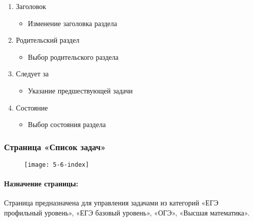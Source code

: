 \begin{enumerate}
\begin{enumerate}
\begin{enumerate}
			\item Заголовок
			\begin{itemize}
				\item Изменение заголовка раздела
			\end{itemize}

			\item Родительский раздел
			\begin{itemize}
				\item Выбор родительского раздела
			\end{itemize}

			\item Следует за
			\begin{itemize}
				\item Указание предшествующей задачи
			\end{itemize}

			\item Состояние
			\begin{itemize}
				\item Выбор состояния раздела
			\end{itemize}

		\end{enumerate}
	\end{enumerate}
\end{enumerate}

\subsubsection{Страница «Список задач»}
\begin{figure}[H]
	\texttt{[image: 5-6-index]}
\end{figure}
\paragraph{Назначение страницы:} Страница предназначена для управления задачами из категорий «ЕГЭ профильный уровень», «ЕГЭ базовый уровень», «ОГЭ», «Высшая математика».

